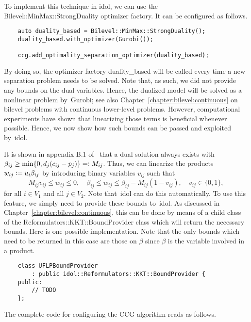 To implement this technique in \textsf{idol}, we can use the
\textsf{Bilevel::MinMax::StrongDuality} optimizer factory. It can be
configured as follows.
%
\begin{lstlisting}
    auto duality_based = Bilevel::MinMax::StrongDuality();
    duality_based.with_optimizer(Gurobi());

    ccg.add_optimality_separation_optimizer(duality_based);
\end{lstlisting}

By doing so, the optimizer factory \textsf{duality\_based} will be called
every time a new separation problem needs to be solved. Note that, as such, we
did not provide any bounds on the dual variables. Hence, the dualized model
will be solved as a nonlinear problem by~\textsf{Gurobi}; see also
Chapter~\ref{chapter:bilevel:continuous} on bilevel problems with continuous
lower-level problems. However, computational experiments have shown that
linearizing those terms is beneficial whenever possible. Hence, we now show
how such bounds can be passed and exploited by~\textsf{idol}.

It is shown in appendix B.1 of~\textcite{Cheng2021} that a dual solution
always exists with $\beta_{ij} \ge \min\{ 0, d_j(c_{ij} - p_j) \} \mathrel{{=}{\mathop:}}
M_{ij}$. Thus, we can linearize the products $w_{ij} \mathrel{{\mathop:}{=}} u_i\beta_{ij}$ by
introducing binary variables $v_{ij}$ such that 
\begin{equation}
    M_{ij}v_{ij} \le w_{ij} \le 0, \quad 
    \beta_{ij} \le w_{ij} \le \beta_{ij} - M_{ij}(1 - v_{ij}), \quad 
    v_{ij} \in \{0,1\},
    \label{eq:ccg:uflp:dual:mccormick}
\end{equation}
for all $i\in V_1$ and all $j\in V_2$. Note that~\textsf{idol} can do this
automatically. To use this feature, we simply need to provide these bounds
to~\textsf{idol}. As discussed in Chapter~\ref{chapter:bilevel:continuous},
this can be done by means of a child class of the
\textsf{Reformulators::KKT::BoundProvider} class which will return the
necessary bounds. Here is one possible implementation. Note that the only
bounds which need to be returned in this case are those on $\beta$ since
$\beta$ is the variable involved in a product.
%
\begin{lstlisting}
    class UFLPBoundProvider 
        : public idol::Reformulators::KKT::BoundProvider {
    public:
        // TODO
    };
\end{lstlisting}

The complete code for configuring the CCG algorithm reads as follows. 

